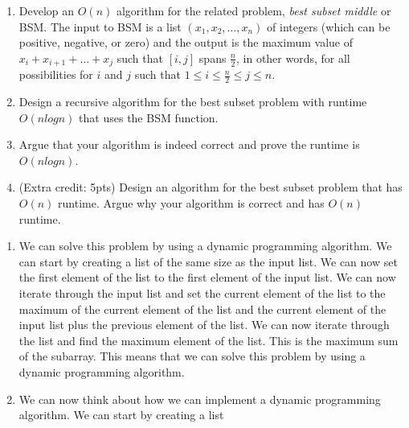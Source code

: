 \documentclass[12pt,letterpaper]{article}
\begin{document}
\begin{enumerate}
    \item{Develop an $O(n)$ algorithm for the related problem, \textit{best subset middle} or BSM. The input to BSM is a list $(x_1, x_2, \ldots , x_n)$ of integers (which can be positive, negative, or zero) and the output is the maximum value of $x_i + x_{i+1} + \ldots + x_j$ such that $[i, j]$ spans $\frac{n}{2}$, in other words, for all possibilities for $i$ and $j$ such that $1 \leq i \leq \frac{n}{2} \leq j \leq n.$}
    \item{Design a recursive algorithm for the best subset problem with runtime $O(n log n)$ that
    uses the BSM function.}
    \item{Argue that your algorithm is indeed correct and prove the runtime is $O(n log n).$}
    \item{ (Extra credit: 5pts) Design an algorithm for the best subset problem that has $O(n)$
    runtime. Argue why your algorithm is correct and has $O(n)$ runtime.}
\end{enumerate}

\begin{enumerate}
    \item We can solve this problem by using a dynamic programming algorithm. We can start by creating a list 
    of the same size as the input list. We can now set the first element of the list to the first element of the 
    input list. We can now iterate through the input list and set the current element of the list to the maximum of 
    the current element of the list and the current element of the input list plus the previous element of the list. 
    We can now iterate through the list and find the maximum element of the list. This is the maximum sum of the subarray. 
    This means that we can solve this problem by using a dynamic programming algorithm.
    \item We can now think about how we can implement a dynamic programming algorithm. We can start by creating a list 
    
\end{enumerate}
\end{document}
